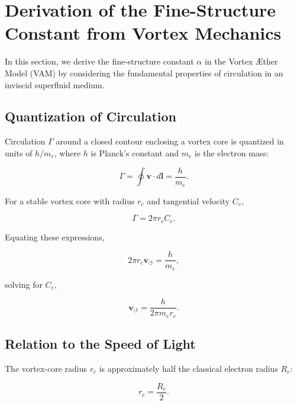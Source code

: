 

\section{Derivation of the Fine-Structure Constant from Vortex Mechanics}
\label{sec:appendix-alpha}

In this section, we derive the fine-structure constant $\alpha$ in the Vortex Æther Model (VAM) by considering the fundamental properties of circulation in an inviscid superfluid medium.

\subsection{Quantization of Circulation}

Circulation $\Gamma$ around a closed contour enclosing a vortex core is quantized in units of $h/m_e$, where $h$ is Planck's constant and $m_e$ is the electron mass:

\begin{equation}
    \Gamma = \oint \mathbf{v} \cdot d\mathbf{l} = \frac{h}{m_e}.
\end{equation}

For a stable vortex core with radius $r_c$ and tangential velocity $C_e$,

\begin{equation}
    \Gamma = 2 \pi r_c C_e.
\end{equation}

Equating these expressions,

\begin{equation}
    2 \pi r_c \mathbf{v}_{\scriptscriptstyle\boldsymbol{\circlearrowleft}} = \frac{h}{m_e},
\end{equation}

solving for $C_e$,

\begin{equation}
    \mathbf{v}_{\scriptscriptstyle\boldsymbol{\circlearrowleft}} = \frac{h}{2 \pi m_e r_c}.
\end{equation}

\subsection{Relation to the Speed of Light}

The vortex-core radius $r_c$ is approximately half the classical electron radius $R_e$:

\begin{equation}
    r_c = \frac{R_e}{2}.
\end{equation}

